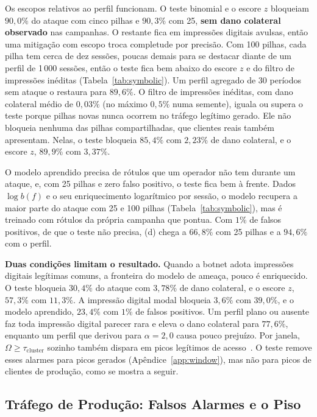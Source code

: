 \documentclass[conference,letterpaper,10pt]{IEEEtran}
\newcommand\1{\textit{(i)}}
\newcommand\2{\textit{(ii)}}
\newcommand\3{\textit{(iii)}}
\begin{document}
Os escopos relativos ao perfil funcionam. O teste binomial e o escore $z$ bloqueiam $90{,}0\%$ do ataque com cinco pilhas e $90{,}3\%$ com 25, \textbf{sem dano colateral observado} nas campanhas. O restante fica em impressões digitais avulsas, então uma mitigação com escopo troca completude por precisão. Com 100 pilhas, cada pilha tem cerca de dez sessões, poucas demais para se destacar diante de um perfil de 1\,000 sessões, então o teste fica bem abaixo do escore $z$ e do filtro de impressões inéditas (Tabela~\ref{tab:symbolic}). Um perfil agregado de 30 períodos sem ataque o restaura para $89{,}6\%$. O filtro de impressões inéditas, com dano colateral médio de $0{,}03\%$ (no máximo $0{,}5\%$ numa semente), iguala ou supera o teste porque pilhas novas nunca ocorrem no tráfego legítimo gerado. Ele não bloqueia nenhuma das pilhas compartilhadas, que clientes reais também apresentam. Nelas, o teste bloqueia $85{,}4\%$ com $2{,}23\%$ de dano colateral, e o escore $z$, $89{,}9\%$ com $3{,}37\%$.

O modelo aprendido precisa de rótulos que um operador não tem durante um ataque, e, com 25 pilhas e zero falso positivo, o teste fica bem à frente. Dados $\log b(f)$ e o seu enriquecimento logarítmico por sessão, o modelo recupera a maior parte do ataque com 25 e 100 pilhas (Tabela~\ref{tab:symbolic}), mas é treinado com rótulos da própria campanha que pontua. Com $1\%$ de falsos positivos, de que o teste não precisa, (d) chega a $66{,}8\%$ com 25 pilhas e a $94{,}6\%$ com o perfil.

\textbf{Duas condições limitam o resultado.} Quando a botnet adota impressões digitais legítimas comuns, a fronteira do modelo de ameaça, pouco é enriquecido. O teste bloqueia $30{,}4\%$ do ataque com $3{,}78\%$ de dano colateral, e o escore $z$, $57{,}3\%$ com $11{,}3\%$. A impressão digital modal bloqueia $3{,}6\%$ com $39{,}0\%$, e o modelo aprendido, $23{,}4\%$ com $1\%$ de falsos positivos. Um perfil plano ou ausente faz toda impressão digital parecer rara e eleva o dano colateral para $77{,}6\%$, enquanto um perfil que derivou para $\alpha = 2{,}0$ causa pouco prejuízo. Por janela, $\Omega \geq \tau_{\mathrm{cluster}}$ sozinho também dispara em picos legítimos de acesso~\cite{jung2002flash}. O teste remove esses alarmes para picos gerados (Apêndice~\ref{app:window}), mas não para picos de clientes de produção, como se mostra a seguir.

\subsection{Tráfego de Produção: Falsos Alarmes e o Piso}
\label{sec:production}
\end{document}
